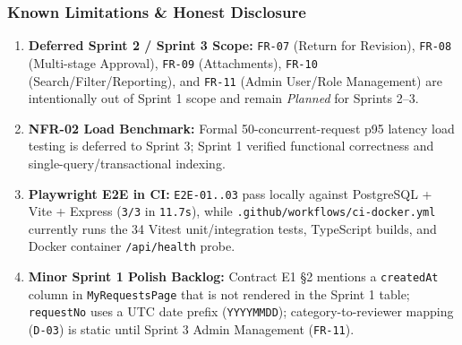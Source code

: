 \documentclass[11pt,a4paper]{article}
\begin{document}
\subsubsection{Known Limitations \& Honest Disclosure}
\begin{enumerate}[leftmargin=*,itemsep=2pt,topsep=2pt]
  \item \textbf{Deferred Sprint 2 / Sprint 3 Scope:} \texttt{FR-07} (Return for Revision), \texttt{FR-08} (Multi-stage Approval), \texttt{FR-09} (Attachments), \texttt{FR-10} (Search/Filter/Reporting), and \texttt{FR-11} (Admin User/Role Management) are intentionally out of Sprint 1 scope and remain \textit{Planned} for Sprints 2–3.
  \item \textbf{NFR-02 Load Benchmark:} Formal 50-concurrent-request p95 latency load testing is deferred to Sprint 3; Sprint 1 verified functional correctness and single-query/transactional indexing.
  \item \textbf{Playwright E2E in CI:} \texttt{E2E-01..03} pass locally against PostgreSQL + Vite + Express (\texttt{3/3} in \texttt{11.7s}), while \texttt{.github/workflows/ci-docker.yml} currently runs the 34 Vitest unit/integration tests, TypeScript builds, and Docker container \texttt{/api/health} probe.
  \item \textbf{Minor Sprint 1 Polish Backlog:} Contract E1 §2 mentions a \texttt{createdAt} column in \texttt{MyRequestsPage} that is not rendered in the Sprint 1 table; \texttt{requestNo} uses a UTC date prefix (\texttt{YYYYMMDD}); category-to-reviewer mapping (\texttt{D-03}) is static until Sprint 3 Admin Management (\texttt{FR-11}).
\end{enumerate}
\end{document}
